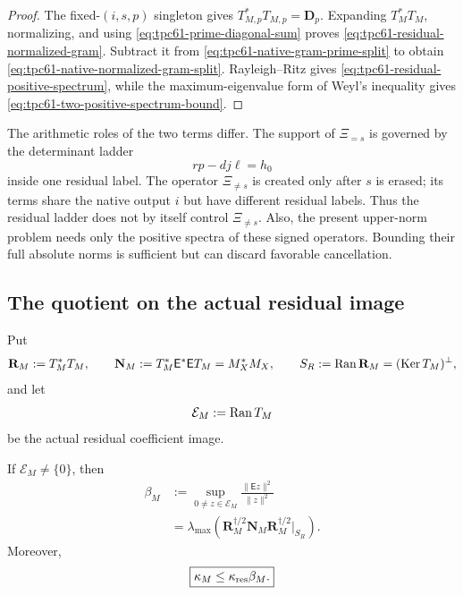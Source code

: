 \begin{proof}
The fixed-\((i,s,p)\) singleton gives
\(T_{M,p}^*T_{M,p}=\mathbf D_p\).  Expanding
\(T_M^*T_M\), normalizing, and using
\eqref{eq:tpc61-prime-diagonal-sum} proves
\eqref{eq:tpc61-residual-normalized-gram}.  Subtract it from
\eqref{eq:tpc61-native-gram-prime-split} to obtain
\eqref{eq:tpc61-native-normalized-gram-split}.  Rayleigh--Ritz gives
\eqref{eq:tpc61-residual-positive-spectrum}, while the maximum-eigenvalue
form of Weyl's inequality gives
\eqref{eq:tpc61-two-positive-spectrum-bound}.
\end{proof}

The arithmetic roles of the two terms differ.  The support of
\(\Xi_{=s}\) is governed by the determinant ladder
\[
 rp-dj\ell=h_0
\]
inside one residual label.  The operator \(\Xi_{\ne s}\) is created only
after \(s\) is erased; its terms share the native output \(i\) but have
different residual labels.  Thus the residual ladder does not by itself
control \(\Xi_{\ne s}\).  Also, the present upper-norm problem needs only
the positive spectra of these signed operators.  Bounding their full
absolute norms is sufficient but can discard favorable cancellation.

\subsection{The quotient on the actual residual image}

Put
\begin{equation}
 \mathbf R_M:=T_M^*T_M,
 \qquad
 \mathbf N_M:=T_M^*\mathsf E^*\mathsf E T_M=M_X^*M_X,
 \qquad
 S_R:=\operatorname{Ran}\mathbf R_M=(\operatorname{Ker} T_M)^\perp,
 \label{eq:tpc61-residual-native-gram-pair}
\end{equation}
and let
\begin{equation}
 \mathcal E_M:=\operatorname{Ran} T_M
 \label{eq:tpc61-actual-residual-image}
\end{equation}
be the actual residual coefficient image.

\begin{theorem}
\label{thm:tpc61-restricted-erasure-norm}
If \(\mathcal E_M\ne\{0\}\), then
\begin{align}
 \beta_M
 &:=\sup_{0\ne z\in\mathcal E_M}
   \frac{\|\mathsf Ez\|^2}{\|z\|^2}
 \label{eq:tpc61-beta-definition}\\
 &=\lambda_{\max}\!\left(
   \mathbf R_M^{\dagger/2}\mathbf N_M
   \mathbf R_M^{\dagger/2}\big|_{S_R}
   \right).
 \label{eq:tpc61-beta-quotient-formula}
\end{align}
Moreover,
\begin{equation}
 \boxed{\kappa_M\le\kappa_{\rm res}\beta_M.}
 \label{eq:tpc61-two-stage-upper}
\end{equation}
\end{theorem}

